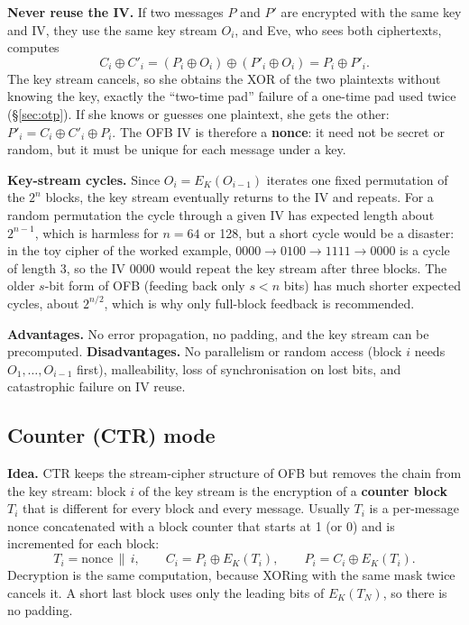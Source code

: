 \textbf{Never reuse the IV.} If two messages $P$ and $P'$ are encrypted with the same key and IV, they use the same key stream $O_i$, and Eve, who sees both ciphertexts, computes
\[
C_i \oplus C'_i = (P_i \oplus O_i) \oplus (P'_i \oplus O_i) = P_i \oplus P'_i .
\]
The key stream cancels, so she obtains the XOR of the two plaintexts without knowing the key, exactly the ``two-time pad'' failure of a one-time pad used twice (\S\ref{sec:otp}). If she knows or guesses one plaintext, she gets the other: $P'_i = C_i \oplus C'_i \oplus P_i$. The OFB IV is therefore a \textbf{nonce}: it need not be secret or random, but it must be unique for each message under a key.

\textbf{Key-stream cycles.} Since $O_i = E_K(O_{i-1})$ iterates one fixed permutation of the $2^n$ blocks, the key stream eventually returns to the IV and repeats. For a random permutation the cycle through a given IV has expected length about $2^{n-1}$, which is harmless for $n = 64$ or 128, but a short cycle would be a disaster: in the toy cipher of the worked example, $0000 \to 0100 \to 1111 \to 0000$ is a cycle of length 3, so the IV $0000$ would repeat the key stream after three blocks. The older $s$-bit form of OFB (feeding back only $s < n$ bits) has much shorter expected cycles, about $2^{n/2}$, which is why only full-block feedback is recommended.

\textbf{Advantages.} No error propagation, no padding, and the key stream can be precomputed. \textbf{Disadvantages.} No parallelism or random access (block $i$ needs $O_1, \dots, O_{i-1}$ first), malleability, loss of synchronisation on lost bits, and catastrophic failure on IV reuse.

\subsection{Counter (CTR) mode \hot\new}

\textbf{Idea.} CTR keeps the stream-cipher structure of OFB but removes the chain from the key stream: block $i$ of the key stream is the encryption of a \textbf{counter block} $T_i$ that is different for every block and every message. Usually $T_i$ is a per-message nonce concatenated with a block counter that starts at 1 (or 0) and is incremented for each block:
\[
T_i = \text{nonce} \,\|\, i, \qquad C_i = P_i \oplus E_K(T_i), \qquad P_i = C_i \oplus E_K(T_i).
\]
Decryption is the same computation, because XORing with the same mask twice cancels it. A short last block uses only the leading bits of $E_K(T_N)$, so there is no padding.


